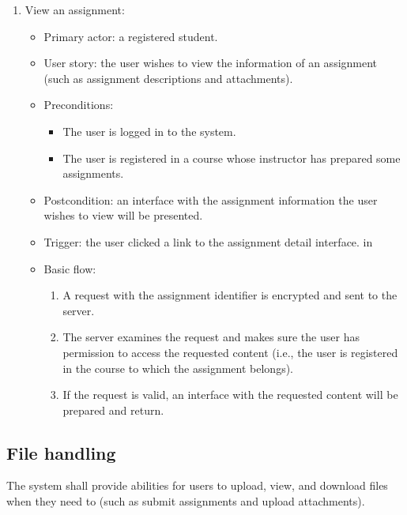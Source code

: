 \begin{enumerate}
\item View an assignment:
\begin{itemize}
    \item Primary actor: a registered student.
    \item User story: the user wishes to view the information of an assignment
     (such as assignment descriptions and attachments).
    \item Preconditions:
        \begin{itemize}
            \item The user is logged in to the system.
            \item The user is registered in a course whose instructor has
                prepared some assignments.
        \end{itemize}
    \item Postcondition: an interface with the assignment information the user
        wish\-es to view will be presented.
    \item Trigger: the user clicked a link to the assignment detail interface.
     in
    \item Basic flow:
        \begin{enumerate}
            \item A request with the assignment identifier is encrypted and
                sent to the server.
            \item The server examines the request and makes sure the user has
                permission to access the requested content (i.e., the user is
                registered in the course to which the assignment belongs).
            \item If the request is valid, an interface with the requested
                content will be prepared and return.
        \end{enumerate}
\end{itemize}
\end{enumerate}

\subsection{File handling}
The system shall provide abilities for users to upload, view, and download
files when they need to (such as submit assignments and upload attachments).

